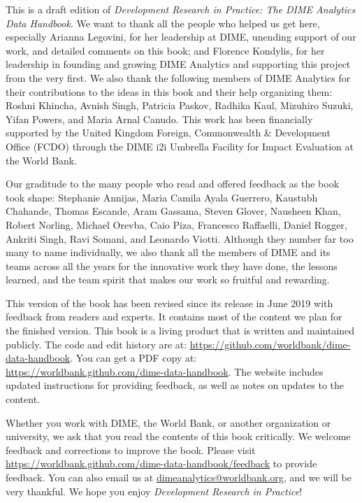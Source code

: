 This is a draft edition of
\textit{Development Research in Practice:
The DIME Analytics Data Handbook}.
We want to thank all the people who helped us get here, especially
Arianna Legovini, for her leadership at DIME, unending support of our work,
and detailed comments on this book; and
Florence Kondylis, for her leadership in founding and growing DIME Analytics
and supporting this project from the very first.
We also thank the following members
of DIME Analytics for their contributions
to the ideas in this book and their help organizing them:
Roshni Khincha, Avnish Singh, Patricia Paskov, Radhika Kaul,
Mizuhiro Suzuki, Yifan Powers, and Maria Arnal Canudo.
This work has been financially supported by the United Kingdom Foreign,
Commonwealth \& Development Office (FCDO) through the
 DIME i2i Umbrella Facility for Impact Evaluation at the World Bank.

Our graditude to the many people who read and offered feedback as the book took shape:
Stephanie Annijas,
Maria Camila Ayala Guerrero,
Kaustubh Chahande,
Thomas Escande,
Aram Gassama,
Steven Glover,
Nausheen Khan,
Robert Norling,
Michael Orevba,
Caio Piza,
Francesco Raffaelli,
Daniel Rogger,
Ankriti Singh,
Ravi Somani,
and Leonardo Viotti.
Although they number far too many to name individually,
we also thank all the members of DIME and its teams across all the years
for the innovative work they have done, the lessons learned,
and the team spirit that makes our work so fruitful and rewarding.

This version of the book has been revised since its release in June 2019
with feedback from readers and experts.
It contains most of the content we plan for the finished version.
This book is a living product that is written and maintained publicly.
The code and edit history are at:
\url{https://github.com/worldbank/dime-data-handbook}.
You can get a PDF copy at:
\url{https://worldbank.github.com/dime-data-handbook}.
The website includes updated instructions
for providing feedback, as well as notes on updates to the content.

Whether you work with DIME, the World Bank,
or another organization or university,
we ask that you read the contents of this book critically.
We welcome feedback and corrections to improve the book.
Please visit
\url{https://worldbank.github.com/dime-data-handbook/feedback}
to provide feedback.
You can also email us at \url{dimeanalytics@worldbank.org},
and we will be very thankful.
We hope you enjoy \textit{Development Research in Practice}!
